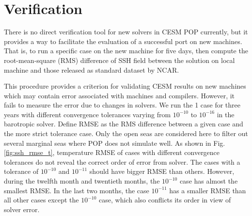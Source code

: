 \section{Verification} \label{se:ver}
%

There is no direct verification tool for new solvers  in CESM POP currently, but it provides a way to facilitate the evaluation of a successful port on new machines. That is, to run a specific case on the new machine for five days, then compute the root-mean-square (RMS) difference of SSH field between the solution on local machine and those released as standard dataset by NCAR.



This procedure provides a criterion for validating CESM results on new machines which may contain error associated with machines and compilers. 
However, it fails to measure the error due to changes in solvers. 
We run the 1 \degree case for three years with different convergence tolerances varying from $10^{-10}$ to $10^{-16}$ in the barotropic solver. 
Define RMSE as the RMS difference between a given case and the more strict tolerance case. Only the open seas are considered here to filter out several marginal seas where POP does not simulate well. 
As shown in Fig.\ref{fig:ssh_rmse_t}, temperature RMSE of cases with different convergence tolerances do not reveal the correct order of error from solver. 
The cases with a tolerance of $10^{-10}$  and $10^{-11}$ should have bigger RMSE than others. However, during the twelfth month and twentieth months, the $10^{-10}$ case has almost the smallest RMSE. In the last two months, the case $10^{-11}$ has a smaller RMSE than all other cases except the $10^{-10}$ case, which also conflicts its order in view of solver error. 

